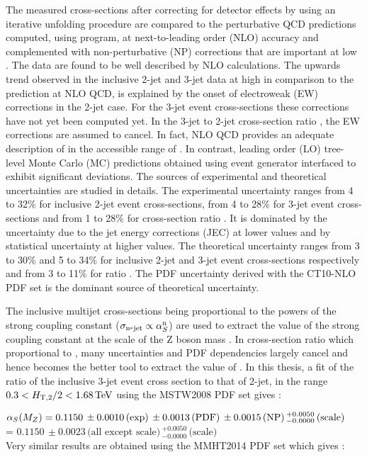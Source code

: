 The measured cross-sections after correcting for detector effects by using an iterative unfolding procedure are compared to the perturbative QCD predictions computed, using \NLOJETPP program, at next-to-leading order (NLO) accuracy and complemented with non-perturbative (NP) corrections that are important at low \httwo. The data are found to be well described by NLO calculations. The upwards trend observed in the inclusive 2-jet and 3-jet data at high \httwo in comparison to the prediction at NLO QCD, is explained by the onset of electroweak (EW) corrections in the 2-jet case. For the 3-jet event cross-sections these corrections have not yet been computed yet. In the 3-jet to 2-jet cross-section ratio \ratio, the EW corrections are assumed to cancel. In fact, NLO QCD provides an adequate description of \ratio in the accessible range of \httwo. In contrast, leading order (LO) tree-level Monte Carlo (MC) predictions obtained using \MadGraphF event generator interfaced to \PYTHIAS exhibit significant deviations. The sources of experimental and theoretical uncertainties are studied in details. The experimental uncertainty ranges from 4 to 32\% for inclusive 2-jet event cross-sections, from 4 to 28\% for 3-jet event cross-sections and from 1 to 28\% for cross-section ratio \ratio. It is dominated by the uncertainty due to the jet energy corrections (JEC) at lower \httwo values and by statistical uncertainty at higher \httwo values. The theoretical uncertainty ranges from 3 to 30\% and 5 to 34\% for inclusive 2-jet and 3-jet event cross-sections respectively and from 3 to 11\% for ratio \ratio. The PDF uncertainty derived with the CT10-NLO PDF set is the dominant source of theoretical uncertainty.

The inclusive multijet cross-sections being proportional to the powers of the strong coupling constant \alps ($\sigma_{\rm n\mbox{-} jet} \propto\alpha_S^{\rm n}$) are used to extract the value of the strong coupling constant at the scale of the Z boson mass \alpsmz. In cross-section ratio \ratio which proportional to \alps, many uncertainties and PDF dependencies largely cancel and hence becomes the better tool to extract the value of \alpsmz. In this thesis, a fit of the ratio of the inclusive 3-jet event cross section to that of 2-jet, \ratio in the range $0.3 < H_{\mathrm{T,2}}/2 < 1.68\,\text{Te\hspace{-.08em}V}$ using the MSTW2008 PDF set gives : 

$\alpha_S(M_Z) = 0.1150\,\pm0.0010\,\textrm{(exp)}\,\pm0.0013\,\textrm{(PDF)}\,\pm0.0015\,\textrm{(NP)}\,^{+0.0050}_{-0.0000}\,\textrm{(scale)}$ \\ \hspace*{24mm} = $0.1150\,\pm0.0023\,\textrm{(all except scale)}\,^{+0.0050}_{-0.0000}\,\textrm{(scale)}$ \\
Very similar results are obtained using the MMHT2014 PDF set which gives : 

